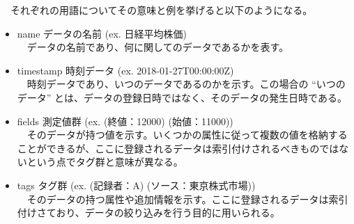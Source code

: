 \documentclass{scrartcl}
\begin{document}
　それぞれの用語についてその意味と例を挙げると以下のようになる。\\
\begin{itemize}
\item name データの名前 (ex. 日経平均株価)\\
　データの名前であり、何に関してのデータであるかを表す。\\
\item timestamp 時刻データ (ex. 2018-01-27T00:00:00Z)\\
　時刻データであり、いつのデータであるのかを示す。この場合の ``いつのデータ'' とは、データの登録日時ではなく、そのデータの発生日時である。\\
\item fields 測定値群 (ex. (終値：12000) (始値：11000))\\
　そのデータが持つ値を示す。いくつかの属性に従って複数の値を格納することができるが、ここに登録されるデータは索引付けされるべきものではないという点でタグ群と意味が異なる。\\
\item tags タグ群 (ex. (記録者：A) (ソース：東京株式市場))\\
　そのデータの持つ属性や追加情報を示す。ここに登録されるデータは索引付けさており、データの絞り込みを行う目的に用いられる。\\
\end{itemize}
\end{document}
